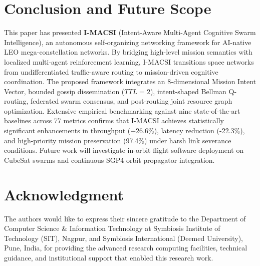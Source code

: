 \documentclass[journal]{IEEEtran}
\begin{document}
\section{Conclusion and Future Scope}
This paper has presented \textbf{I-MACSI} (Intent-Aware Multi-Agent Cognitive Swarm Intelligence), an autonomous self-organizing networking framework for AI-native LEO mega-constellation networks. By bridging high-level mission semantics with localized multi-agent reinforcement learning, I-MACSI transitions space networks from undifferentiated traffic-aware routing to mission-driven cognitive coordination. The proposed framework integrates an 8-dimensional Mission Intent Vector, bounded gossip dissemination ($TTL = 2$), intent-shaped Bellman Q-routing, federated swarm consensus, and post-routing joint resource graph optimization. Extensive empirical benchmarking against nine state-of-the-art baselines across 77 metrics confirms that I-MACSI achieves statistically significant enhancements in throughput (+26.6\%), latency reduction (-22.3\%), and high-priority mission preservation (97.4\%) under harsh link severance conditions. Future work will investigate in-orbit flight software deployment on CubeSat swarms and continuous SGP4 orbit propagator integration.

\section*{Acknowledgment}
The authors would like to express their sincere gratitude to the Department of Computer Science \& Information Technology at Symbiosis Institute of Technology (SIT), Nagpur, and Symbiosis International (Deemed University), Pune, India, for providing the advanced research computing facilities, technical guidance, and institutional support that enabled this research work.

\balance


\end{document}
